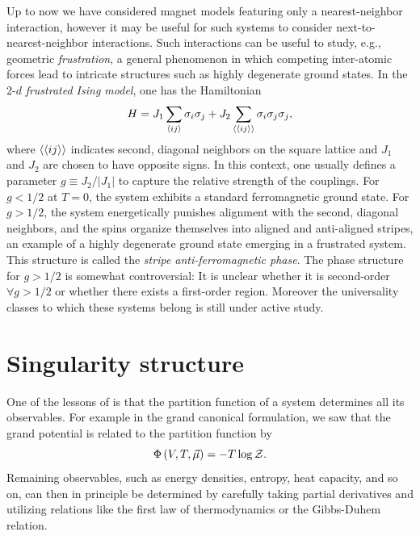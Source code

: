 Up to now we have considered magnet models featuring only a nearest-neighbor
interaction, however it may be useful for such systems to consider
next-to-nearest-neighbor interactions. Such interactions can be useful to study,
e.g., geometric {\it frustration}, a general phenomenon in
which competing inter-atomic forces lead to intricate structures such as
highly degenerate ground states. In the 2-$d$ {\it frustrated Ising model}, one has the Hamiltonian
\begin{equation}
H=J_1\sum_{\ev{i j}} \sigma_i \sigma_j + J_2\sum_{\ev{\ev{i j}}} \sigma_i \sigma_j
\sigma_j,
\end{equation}
where $\ev{\ev{ij}}$ indicates second, diagonal neighbors on the square lattice
and $J_1$ and $J_2$ are chosen to have opposite signs. In this context, one
usually defines a parameter $g\equiv J_2/|J_1|$ to capture the relative strength
of the couplings. For $g<1/2$ at $T=0$, the system exhibits a standard
ferromagnetic ground state. For $g>1/2$, the system energetically punishes
alignment with the second, diagonal neighbors, and the spins organize themselves
into aligned and anti-aligned stripes, an example of a highly degenerate ground
state emerging in a frustrated system. This structure is called the
{\it stripe anti-ferromagnetic phase}.
The phase structure for $g>1/2$ is somewhat controversial: It is
unclear whether it is second-order $\forall g>1/2$ or whether there exists a
first-order region. Moreover the universality classes to which these systems
belong is still under active study.


\section{Singularity structure}\label{sec:leeyang}

One of the lessons of  is that the partition function of a
system determines all its observables. For example in the grand canonical
formulation, we saw that the grand potential is related to the partition
function by
\begin{equation}\label{eq:grandPotZ}
  \Phi\left(V,T,\vec{\mu}\right)=-T\log\mathcal{Z}.
\end{equation}
Remaining observables, such as energy densities, entropy, heat capacity, and so
on, can then in principle be determined by carefully taking partial derivatives
and utilizing relations like the first law of thermodynamics or the Gibbs-Duhem
relation.


